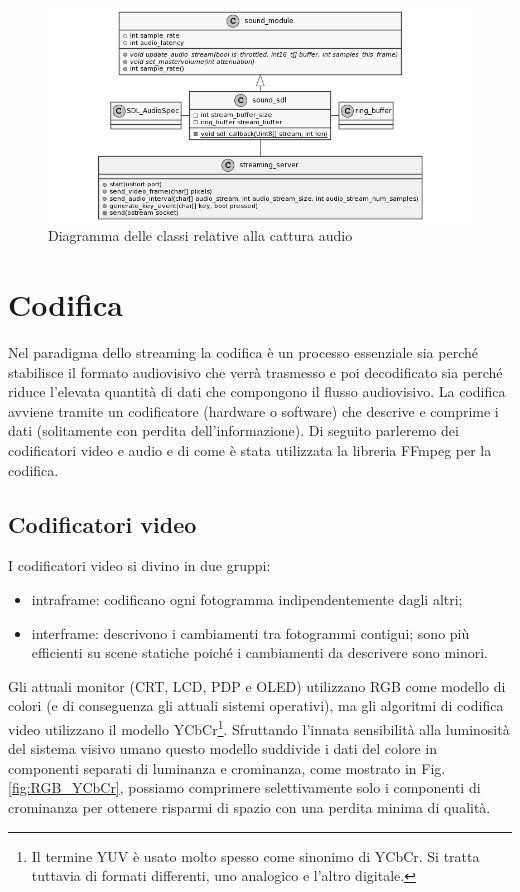 \begin{figure}[H]
	\includegraphics[width=\linewidth]{immagini/class_mixingSDL_streaming}
	\caption{Diagramma delle classi relative alla cattura audio}
	\label{fig:class_mixingSDL_streaming}
\end{figure}



\section{Codifica} \label{sec:cap3_Codifica}
Nel paradigma dello streaming la codifica è un processo essenziale sia perché stabilisce il formato audiovisivo che verrà trasmesso e poi decodificato sia perché riduce l'elevata quantità di dati che compongono il flusso audiovisivo. La codifica avviene tramite un codificatore (hardware o software) che descrive e comprime i dati (solitamente con perdita dell'informazione). Di seguito parleremo dei codificatori video e audio e di come è stata utilizzata la libreria FFmpeg per la codifica.

\subsection{Codificatori video}
I codificatori video si divino in due gruppi:

\begin{itemize}
	\item intraframe: codificano ogni fotogramma indipendentemente dagli altri;
	\item interframe: descrivono i cambiamenti tra fotogrammi contigui; sono più efficienti su scene statiche poiché i cambiamenti da descrivere sono minori.
\end{itemize}

Gli attuali monitor (CRT, LCD, PDP e OLED) utilizzano RGB come modello di colori (e di conseguenza gli attuali sistemi operativi), ma gli algoritmi di codifica video utilizzano il modello YCbCr\footnote{Il termine YUV è usato molto spesso come sinonimo di YCbCr. Si tratta tuttavia di formati differenti, uno analogico e l'altro digitale.}. Sfruttando l'innata sensibilità alla luminosità del sistema visivo umano questo modello suddivide i dati del colore in componenti separati di luminanza e crominanza, come mostrato in Fig. \ref{fig:RGB_YCbCr}, possiamo comprimere selettivamente solo i componenti di crominanza per ottenere risparmi di spazio con una perdita minima di qualità.

